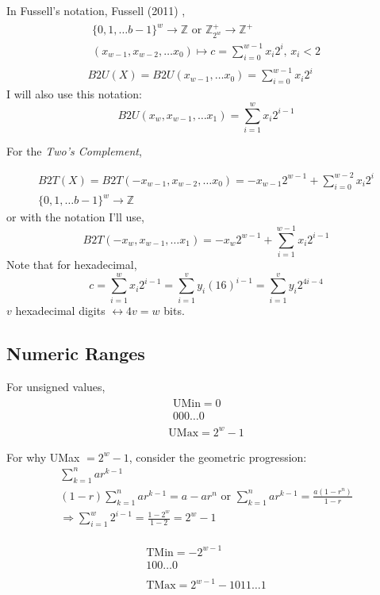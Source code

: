 \documentclass[10pt]{amsart}
\begin{document}
In Fussell's notation, Fussell (2011) \cite{Fuss2011},
\[
\begin{gathered}
\begin{gathered}
\lbrace 0 ,1, \dots b-1 \rbrace^w \to \mathbb{Z} \text{ or } \mathbb{Z}^+_{2^w} \to \mathbb{Z}^+ \\
(x_{w-1}, x_{w-2}, \dots x_0) \mapsto c = \sum_{i=0}^{w-1} x_i 2^i, \, x_i < 2
\end{gathered} \\
B2U(X) = B2U(x_{w-1}, \dots x_0) = \sum_{i=0}^{w-1} x_i 2^i
\end{gathered}
\]
I will also use this notation:
\[
B2U(x_w, x_{w-1}, \dots x_1) = \sum_{i=1}^w x_i 2^{i-1}
\]

For the \emph{Two's Complement},

\[
\begin{gathered}
B2T(X) = B2T(-x_{w-1}, x_{w-2}, \dots x_0) = -x_{w-1}2^{w-1} + \sum_{i=0}^{w-2} x_i 2^i \\
\lbrace 0 , 1, \dots b-1 \rbrace^w \to \mathbb{Z} 
\end{gathered}
\]
or with the notation I'll use,
\[
B2T(-x_w, x_{w-1}, \dots x_1) = -x_w 2^{w-1} + \sum_{i=1}^{w-1} x_i 2^{i-1}
\]
Note that for hexadecimal,
\[
c = \sum_{i=1}^w x_i 2^{i-1} = \sum_{i=1}^v y_i (16)^{i-1} = \sum_{i=1}^v y_i 2^{4i-4}
\]
$v$ hexadecimal digits $\leftrightarrow  4v = w$ bits.

\subsection{Numeric Ranges}

For unsigned values, 
\[
\begin{gathered}
\begin{gathered} 
\text{UMin} = 0 \\
000 \dots 0 
\end{gathered} \\
\text{UMax} = 2^w - 1  
\end{gathered}
\]

For why UMax $=2^w -1$, consider the geometric progression:
\[
\begin{gathered}
\sum_{k=1}^n ar^{k-1} \\
(1-r) \sum_{k=1}^n ar^{k-1} = a-ar^n \text{ or } \sum_{k=1}^n ar^{k-1} = \frac{a(1-r^n) }{1-r} \\
\Longrightarrow \sum_{i=1}^w 2^{i-1} = \frac{1-2^w}{1-2} = 2^w - 1
\end{gathered}
\]

\[
\begin{gathered}
\begin{gathered} 
\text{TMin} = -2^{w-1} \\
100 \dots 0 
\end{gathered} \\
\begin{gathered} 
\text{TMax} = 2^{w-1} - 1
011\dots 1
\end{gathered}
\end{gathered} 
\]
\end{document}
